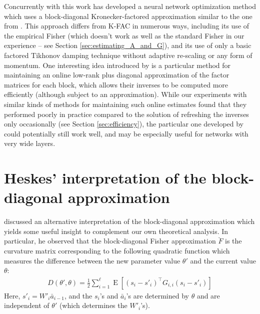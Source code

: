 \documentclass[12pt]{article}
\newcommand{\acronym}{K-FAC}
\newcommand{\expected}{\operatorname{E}}
\begin{document}
Concurrently with this work \citet{povey_ng} has developed a neural network optimization method which uses a block-diagonal Kronecker-factored approximation similar to the one from \citet{heskes}.  This approach differs from \acronym{} in numerous ways, including its use of the empirical Fisher (which doesn't work as well as the standard Fisher in our experience -- see Section \ref{sec:estimating_A_and_G}), and its use of only a basic factored Tikhonov damping technique without adaptive re-scaling or any form of momentum.  One interesting idea introduced by \citet{povey_ng} is a particular method for maintaining an online low-rank plus diagonal approximation of the factor matrices for each block, which allows their inverses to be computed more efficiently (although subject to an approximation).  While our experiments with similar kinds of methods for maintaining such online estimates found that they performed poorly in practice compared to the solution of refreshing the inverses only occasionally (see Section \ref{sec:efficiency}), the particular one developed by \citet{povey_ng} could potentially still work well, and may be especially useful for networks with very wide layers.





\vspace{-0.1in}
\section{Heskes' interpretation of the block-diagonal approximation}
\vspace{-0.075in}

\citet{heskes} discussed an alternative interpretation of the block-diagonal approximation which yields some useful insight to complement our own theoretical analysis. In particular, he observed that the block-diagonal Fisher approximation $\breve{F}$ is the curvature matrix corresponding to the following quadratic function which measures the difference between the new parameter value $\theta'$ and the current value $\theta$:
\begin{align*}
D(\theta', \theta) = \frac{1}{2} \sum_{i=1}^\ell \expected\left[ (s_i - s'_i)^\top G_{i,i} (s_i - s'_i) \right] %
\end{align*}
Here, $s'_i = W'_i \bar{a}_{i-1}$, and the $s_i$'s and $\bar{a}_i$'s are determined by $\theta$ and are independent of $\theta'$ (which determines the $W'_i$'s).  
\end{document}
